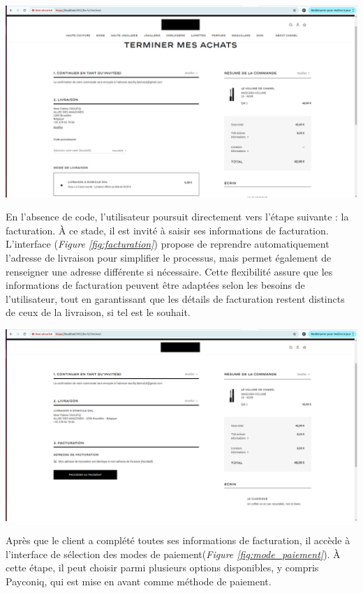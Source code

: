 \begin{center}
    \centering
    \includegraphics[width=19cm]{Figures/Screens/code prommo.png}
    \label{fig:promo}
\end{center}
En l'absence de code, l'utilisateur poursuit directement vers l'étape suivante : la facturation. À ce stade, il est invité à saisir ses informations de facturation. L'interface (\textit{Figure \ref{fig:facturation}}) propose de reprendre automatiquement l'adresse de livraison pour simplifier le processus, mais permet également de renseigner une adresse différente si nécessaire. Cette flexibilité assure que les informations de facturation peuvent être adaptées selon les besoins de l'utilisateur, tout en garantissant que les détails de facturation restent distincts de ceux de la livraison, si tel est le souhait.
\begin{center}
    \centering
    \includegraphics[width=19cm]{Figures/Screens/passe au facturation.png}
    \label{fig:facturation}
\end{center}
Après que le client a complété toutes ses informations de facturation, il accède à l'interface de sélection des modes de paiement(\textit{Figure \ref{fig:mode_paiement}}). À cette étape, il peut choisir parmi plusieurs options disponibles, y compris Payconiq, qui est mise en avant comme méthode de paiement. 

